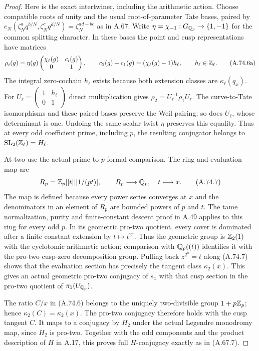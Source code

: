 \begin{proof}
Here is the exact intertwiner, including the arithmetic
action.  Choose compatible roots of unity and the usual
root-of-parameter Tate bases, paired by
$e_N(\zeta_N^a q^{b/N},\zeta_N^c q^{d/N})
=\zeta_N^{ad-bc}$ as in A.67.  Write
$\eta=\chi_{-1}:G_{\mathbb Q_p}\to\{1,-1\}$ for the common
splitting character.  In these bases the point and cusp
representations have matrices
\[
 \rho_i(g)=\eta(g)
    \begin{pmatrix}\chi_\ell(g)&c_i(g)\\0&1\end{pmatrix},
 \qquad c_2(g)-c_1(g)=(\chi_\ell(g)-1)h_\ell,
       \qquad h_\ell\in\mathbb Z_\ell.
\tag{A.74.6a}
\]
The integral zero-cochain $h_\ell$ exists because both
extension classes are $\kappa_\ell(q_x)$.
For $U_\ell=\left(\begin{smallmatrix}1&h_\ell\\0&1
\end{smallmatrix}\right)$ direct multiplication gives
$\rho_2=U_\ell^{-1}\rho_1U_\ell$.
The curve-to-Tate isomorphisms and these paired bases
preserve the Weil pairing; so does $U_\ell$, whose
determinant is one.  Undoing the same scalar twist
$\eta$ preserves this equality.  Thus at every odd
coefficient prime, including $p$, the resulting
conjugator belongs to
$\operatorname{SL}_2(\mathbb Z_\ell)=H_\ell$.

At two use the actual prime-to-$p$ formal comparison.
The ring and evaluation map are
\[
 R_p=\mathbb Z_p[[t]][1/(pt)],\qquad
 R_p\longrightarrow\mathbb Q_p,
                         \quad t\longmapsto x.
\tag{A.74.7}
\]
The map is defined because every power series converges
at $x$ and the denominators in an element of $R_p$
are bounded powers of $p$ and $t$.
The tame normalization, purity and finite-constant
descent proof in A.49 applies to this ring for every
odd $p$.  In its geometric pro-two quotient, every
cover is dominated after a finite constant extension
by $t\mapsto t^{2^a}$.
Thus the geometric group is $\mathbb Z_2(1)$ with the
cyclotomic arithmetic action; comparison with
$\mathbb Q_p((t))$ identifies it with the pro-two
cusp-zero decomposition group.
Pulling back $z^{2^a}=t$ along (A.74.7) shows that
the evaluation section has precisely the tangent
class $\kappa_2(x)$.
This gives an actual geometric pro-two conjugacy of
$s_x$ with that cusp section in the pro-two quotient
of $\pi_1(U_{\mathbb Q_p})$.

The ratio $C/x$ in (A.74.6) belongs to the uniquely
two-divisible group $1+p\mathbb Z_p$; hence
$\kappa_2(C)=\kappa_2(x)$.
The pro-two conjugacy therefore holds with the
cusp tangent $C$.
It maps to a conjugacy by $H_2$ under the actual
Legendre monodromy map, since $H_2$ is pro-two.
Together with the odd components and the product
description of $H$ in A.17, this proves full
$H$-conjugacy exactly as in (A.67.7).


\end{proof}
